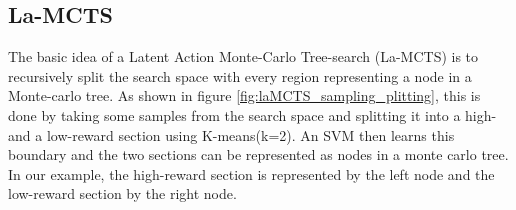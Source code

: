 \documentclass[bibliography=totoc]{scrartcl}
\begin{document}

\newpage
\subsection{La-MCTS}
The basic idea of a Latent Action Monte-Carlo Tree-search (La-MCTS) is to recursively split the search space with every region representing a node in a Monte-carlo tree.\cite{La-MCTS}
As shown in figure \ref{fig:laMCTS_sampling_plitting}, this is done by taking some samples from the search space and splitting it into a high- and a low-reward section using K-means(k=2). 
An SVM then learns this boundary and the two sections can be represented as nodes in a monte carlo tree.
In our example, the high-reward section is represented by the left node and the low-reward section by the right node.
\end{document}
